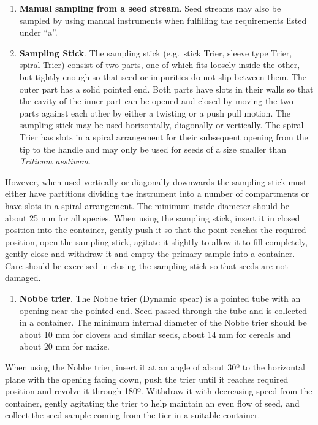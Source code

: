 \documentclass[
]{book}
\providecommand{\tightlist}{%
  \setlength{\itemsep}{0pt}\setlength{\parskip}{0pt}}
\begin{document}
\begin{enumerate}
\def\labelenumi{\alph{enumi}.}
\item
  \textbf{Manual sampling from a seed stream}. Seed streams may also be sampled by using manual instruments when fulfilling the requirements listed under ``a''.
\item
  \textbf{Sampling Stick}. The sampling stick (e.g.~stick Trier, sleeve type Trier, spiral Trier) consist of two parts, one of which fits loosely inside the other, but tightly enough so that seed or impurities do not slip between them. The outer part has a solid pointed end. Both parts have slots in their walls so that the cavity of the inner part can be opened and closed by moving the two parts against each other by either a twisting or a push pull motion. The sampling stick may be used horizontally, diagonally or vertically. The spiral Trier has slots in a spiral arrangement for their subsequent opening from the tip to the handle and may only be used for seeds of a size smaller than \emph{Triticum aestivum}.
\end{enumerate}

However, when used vertically or diagonally downwards the sampling stick must either have partitions dividing the instrument into a number of compartments or have slots in a spiral arrangement. The minimum inside diameter should be about 25 mm for all species.
When using the sampling stick, insert it in closed position into the container, gently push it so that the point reaches the required position, open the sampling stick, agitate it slightly to allow it to fill completely, gently close and withdraw it and empty the primary sample into a container. Care should be exercised in closing the sampling stick so that seeds are not damaged.

\begin{enumerate}
\def\labelenumi{\alph{enumi}.}
\setcounter{enumi}{2}
\tightlist
\item
  \textbf{Nobbe trier}. The Nobbe trier (Dynamic spear) is a pointed tube with an opening near the pointed end. Seed passed through the tube and is collected in a container. The minimum internal diameter of the Nobbe trier should be about 10 mm for clovers and similar seeds, about 14 mm for cereals and about 20 mm for maize.
\end{enumerate}

When using the Nobbe trier, insert it at an angle of about 30º to the horizontal plane with the opening facing down, push the trier until it reaches required position and revolve it through 180º. Withdraw it with decreasing speed from the container, gently agitating the trier to help maintain an even flow of seed, and collect the seed sample coming from the tier in a suitable container.
\end{document}
